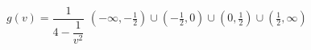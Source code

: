 {$g(v) = \dfrac{1}{4 - \dfrac{1}{v^{2}}}$}
{$\left( -\infty, -\frac{1}{2} \right) \cup \left( -\frac{1}{2}, 0 \right) \cup \left(0, \frac{1}{2} \right) \cup \left( \frac{1}{2}, \infty\right)$}

